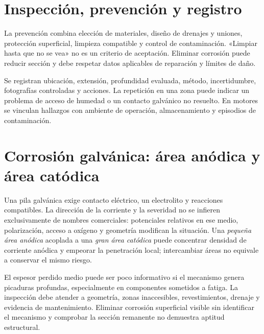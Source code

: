 \section{Inspección, prevención y registro}
La prevención combina elección de materiales, diseño de drenajes y uniones, protección superficial, limpieza compatible y control de contaminación. «Limpiar hasta que no se vea» no es un criterio de aceptación. Eliminar corrosión puede reducir sección y debe respetar datos aplicables de reparación y límites de daño.

Se registran ubicación, extensión, profundidad evaluada, método, incertidumbre, fotografías controladas y acciones. La repetición en una zona puede indicar un problema de acceso de humedad o un contacto galvánico no resuelto. En motores se vinculan hallazgos con ambiente de operación, almacenamiento y episodios de contaminación.
\section{Corrosión galvánica: área anódica y área catódica}
Una pila galvánica exige contacto eléctrico, un electrolito y reacciones compatibles. La dirección de la corriente y la severidad no se infieren exclusivamente de nombres comerciales: potenciales relativos en ese medio, polarización, acceso a oxígeno y geometría modifican la situación. Una \emph{pequeña área anódica} acoplada a una \emph{gran área catódica} puede concentrar densidad de corriente anódica y empeorar la penetración local; intercambiar áreas no equivale a conservar el mismo riesgo.

El espesor perdido medio puede ser poco informativo si el mecanismo genera picaduras profundas, especialmente en componentes sometidos a fatiga. La inspección debe atender a geometría, zonas inaccesibles, revestimientos, drenaje y evidencia de mantenimiento. Eliminar corrosión superficial visible sin identificar el mecanismo y comprobar la sección remanente no demuestra aptitud estructural.


